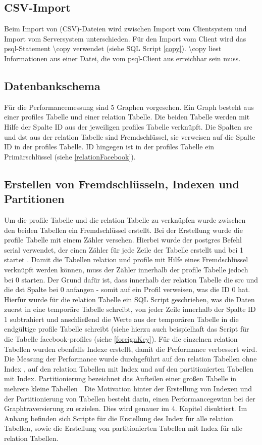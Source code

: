 \subsection{CSV-Import}
Beim Import von (CSV)-Dateien wird zwischen Import vom Clientsystem und  Import vom Serversystem unterschieden.
Für den Import vom Client wird das psql-Statement \textbackslash copy verwendet (siehe SQL Script \ref{copy}). \textbackslash copy liest Informationen aus einer Datei,
die vom psql-Client aus erreichbar sein muss. \cite{postgres2018}

\subsection{Datenbankschema}
Für die Performancemessung sind 5 Graphen vorgesehen. Ein Graph besteht aus einer profiles Tabelle und einer relation Tabelle. Die beiden Tabelle werden mit Hilfe der
Spalte ID aus der jeweiligen profiles Tabelle verknüpft. Die Spalten src und dst aus der relation Tabelle sind Fremdschlüssel, sie verweisen auf die Spalte ID in der
profiles Tabelle. ID hingegen ist in der profiles Tabelle ein Primärschlüssel (siehe \ref{relationFacebook}).

\subsection{Erstellen von Fremdschlüsseln, Indexen und Partitionen}
Um die profile Tabelle und die relation Tabelle zu verknüpfen wurde zwischen den beiden Tabellen ein Fremdschlüssel erstellt. Bei der Erstellung wurde die profile Tabelle
mit einem Zähler versehen. Hierbei wurde der postgres Befehl serial verwendet, der einen Zähler für jede Zeile der Tabelle erstellt und bei 1 startet . Damit die Tabellen
relation und profile mit Hilfe eines Fremdschlüssel verknüpft werden können, muss der Zähler innerhalb der profile Tabelle jedoch bei 0 starten. Der Grund dafür ist, dass
innerhalb der relation Tabelle die src und die dst Spalte bei 0 anfangen - somit auf ein Profil verweisen, was die ID 0 hat. Hierfür wurde für die relation Tabelle ein
SQL Script geschrieben, was die Daten zuerst in eine temporäre Tabelle schreibt, von jeder Zeile innerhalb der Spalte ID 1 subtrahiert und anschließend die Werte aus
der temporären Tabelle in die endgültige profile Tabelle schreibt (siehe hierzu auch beispielhaft das Script für die Tabelle facebook-profiles (siehe \ref{foreignKey}).
Für die einzelnen relation Tabellen wurden ebenfalls Indexe erstellt, damit die Performance verbessert wird. Die Messung der Performance wurde durchgeführt auf
den relation Tabellen ohne Index , auf den relation Tabellen mit Index und auf den partitionierten Tabellen mit Index. Partitionierung bezeichnet das Aufteilen einer
großen Tabelle in mehrere kleine Tabellen \cite{postgrespartitioning} . Die Motivation hinter der Erstellung von Indexen und der Partitionierung von Tabellen besteht darin,
einen Performancegewinn bei der Graphtraversierung zu erzielen. Dies wird genauer im 4. Kapitel disuktiert.
Im Anhang befinden sich Scripte für die Erstellung des Index für alle relation Tabellen, sowie die Erstellung von partitionierten Tabellen
mit Index für alle relation Tabellen.

